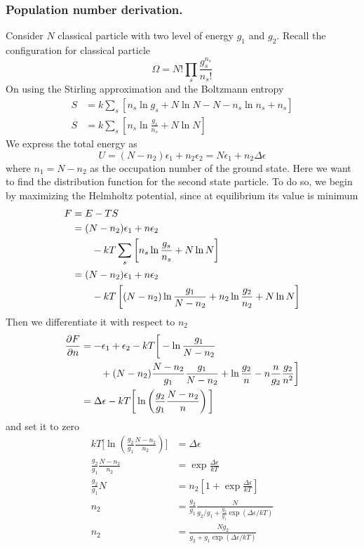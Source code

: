 \documentclass[../../../Main.tex]{subfiles}
\begin{document}
\subsubsection*{Population number derivation.} Consider $N$ classical particle with two level of energy $g_1$ and $g_2$. Recall the configuration for classical particle
\begin{equation*}
    \Omega=N!\prod_s \frac{g_s^{n_s}}{n_s!}
\end{equation*}
On using the Stirling approximation and the Boltzmann entropy
\begin{align*}
    S&=k\sum_s\left[n_s\ln g_s+N\ln N-N-n_s\ln n_s+n_s\right]\\
    S&=k\sum_s\left[n_s\ln \frac{g_s}{n_s}+N\ln N\right]
\end{align*}
We express the total energy as 
\begin{equation*}
    U=(N-n_2)\epsilon_1+n_2\epsilon_2=N\epsilon_1+n_2\Delta\epsilon
\end{equation*}
where $n_1=N-n_2$ as the occupation number of the ground state. Here we want to find the distribution function for the second state particle. To do so, we begin by maximizing the Helmholtz potential, since at equilibrium its value is minimum
\begin{align*}
    F&=E-TS\\
    &=(N-n_2)\epsilon_1+n\epsilon_2\notag\\
    &\qquad-kT\sum_s\left[n_s\ln \frac{g_s}{n_s}+N\ln N\right]\\
    &=(N-n_2)\epsilon_1+n\epsilon_2\notag\\
    &\qquad-kT\left[(N-n_2)\ln \frac{g_1}{N-n_2}+n_2\ln\frac{g_2}{n_2}+N\ln N\right]
\end{align*}
Then we differentiate it with respect to $n_2$ 
\begin{align*}
    \frac{\partial F}{\partial n}&=-\epsilon_1+\epsilon_2 -kT\bigg[-\ln\frac{g_1}{N-n_2}\notag\\
    &\qquad+(N-n_2)\frac{N-n_2}{g_1}\frac{g_1}{N-n_2} +\ln\frac{g_2}{n} -n\frac{n}{g_2}\frac{g_2}{n^2}\bigg]\\
    &=\Delta\epsilon-kT\bigg[\ln\left(\frac{g_2}{g_1}\frac{N-n_2}{n}\right)\bigg]\label{eq:dFdn}
\end{align*}
and set it to zero
\begin{align*}
    kT\bigg[\ln\left(\frac{g_2}{g_1}\frac{N-n_2}{n_2}\right)\bigg]&=\Delta\epsilon\\
    \frac{g_2}{g_1}\frac{N-n_2}{n_2}&=\exp \frac{\Delta\epsilon}{kT}\\
    \frac{g_2}{g_1}N&=n_2\left[1+\exp \frac{\Delta\epsilon}{kT}\right]\\
    n_2&=\frac{g_2}{g_1}\frac{N}{g_2/g_1+\frac{g_2}{g_1}\exp(\Delta\epsilon/kT)}\\
    n_2&=\frac{Ng_2}{g_2+g_1\exp(\Delta\epsilon/kT)}
\end{align*}
\end{document}
